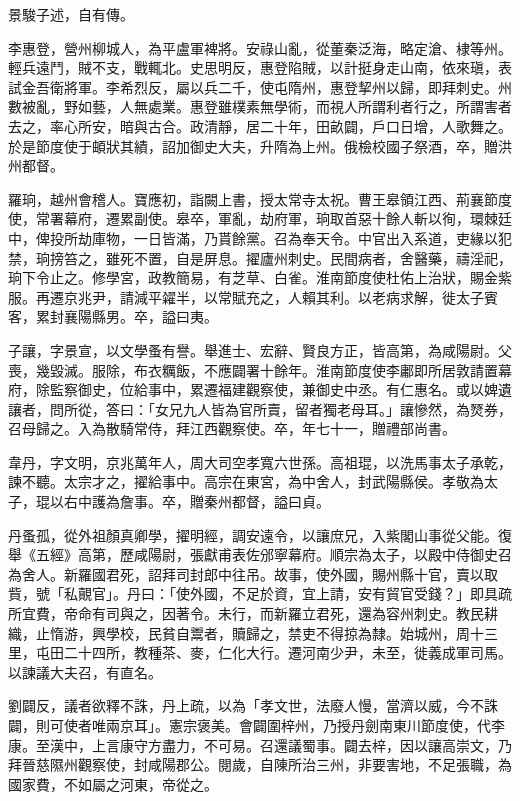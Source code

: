 \begin{pinyinscope}
 景駿子述，自有傳。



 李惠登，營州柳城人，為平盧軍裨將。安祿山亂，從董秦泛海，略定滄、棣等州。輕兵遠鬥，賊不支，戰輒北。史思明反，惠登陷賊，以計挺身走山南，依來瑱，表試金吾衛將軍。李希烈反，屬以兵二千，使屯隋州，惠登挈州以歸，即拜刺史。州數被亂，野如藝，人無處業。惠登雖樸素無學術，而視人所謂利者行之，所謂害者去之，率心所安，暗與古合。政清靜，居二十年，田畝闢，戶口日增，人歌舞之。於是節度使于頔狀其績，詔加御史大夫，升隋為上州。俄檢校國子祭酒，卒，贈洪州都督。



 羅珦，越州會稽人。寶應初，詣闕上書，授太常寺太祝。曹王皋領江西、荊襄節度使，常署幕府，遷累副使。皋卒，軍亂，劫府軍，珦取首惡十餘人斬以徇，環棘廷中，俾投所劫庫物，一日皆滿，乃貰餘黨。召為奉天令。中官出入系道，吏緣以犯禁，珦搒笞之，雖死不置，自是屏息。擢廬州刺史。民間病者，舍醫藥，禱淫祀，珦下令止之。修學宮，政教簡易，有芝草、白雀。淮南節度使杜佑上治狀，賜金紫服。再遷京兆尹，請減平糴半，以常賦充之，人賴其利。以老病求解，徙太子賓客，累封襄陽縣男。卒，謚曰夷。



 子讓，字景宣，以文學蚤有譽。舉進士、宏辭、賢良方正，皆高第，為咸陽尉。父喪，幾毀滅。服除，布衣糲飯，不應闢署十餘年。淮南節度使李鄘即所居敦請置幕府，除監察御史，位給事中，累遷福建觀察使，兼御史中丞。有仁惠名。或以婢遺讓者，問所從，答曰：「女兄九人皆為官所賣，留者獨老母耳。」讓慘然，為燹券，召母歸之。入為散騎常侍，拜江西觀察使。卒，年七十一，贈禮部尚書。



 韋丹，字文明，京兆萬年人，周大司空孝寬六世孫。高祖琨，以洗馬事太子承乾，諫不聽。太宗才之，擢給事中。高宗在東宮，為中舍人，封武陽縣侯。孝敬為太子，琨以右中護為詹事。卒，贈秦州都督，謚曰貞。



 丹蚤孤，從外祖顏真卿學，擢明經，調安遠令，以讓庶兄，入紫閣山事從父能。復舉《五經》高第，歷咸陽尉，張獻甫表佐邠寧幕府。順宗為太子，以殿中侍御史召為舍人。新羅國君死，詔拜司封郎中往吊。故事，使外國，賜州縣十官，賣以取貲，號「私覿官」。丹曰：「使外國，不足於資，宜上請，安有貿官受錢？」即具疏所宜費，帝命有司與之，因著令。未行，而新羅立君死，還為容州刺史。教民耕織，止惰游，興學校，民貧自鬻者，贖歸之，禁吏不得掠為隸。始城州，周十三里，屯田二十四所，教種茶、麥，仁化大行。遷河南少尹，未至，徙義成軍司馬。以諫議大夫召，有直名。



 劉闢反，議者欲釋不誅，丹上疏，以為「孝文世，法廢人慢，當濟以威，今不誅闢，則可使者唯兩京耳」。憲宗褒美。會闢圍梓州，乃授丹劍南東川節度使，代李康。至漢中，上言康守方盡力，不可易。召還議蜀事。闢去梓，因以讓高崇文，乃拜晉慈隰州觀察使，封咸陽郡公。閱歲，自陳所治三州，非要害地，不足張職，為國家費，不如屬之河東，帝從之。




\end{pinyinscope}
